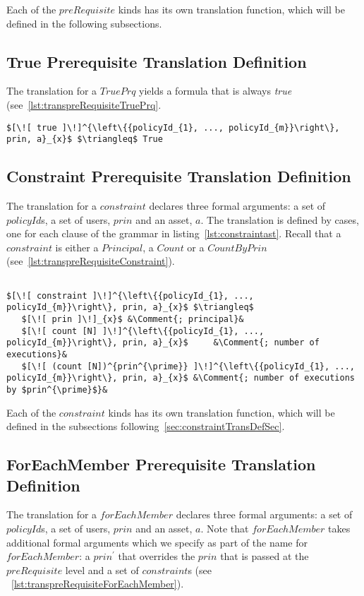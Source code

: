Each of the $preRequisite$ kinds has its own translation function, which will be defined in the following subsections.

\subsection{True Prerequisite Translation Definition}
The translation for a $TruePrq$ yields a formula that is always \emph{true} (see~\ref{lst:transpreRequisiteTruePrq}.

\lstset{mathescape, language=AST}  
\begin{lstlisting}[frame=single, caption={Prerequisite Translation Definition {$\colon$} Always True Prerequisite},label={lst:transpreRequisiteTruePrq}]
	$[\![ true ]\!]^{\left\{{policyId_{1}, ..., policyId_{m}}\right\}, prin, a}_{x}$ $\triangleq$ True
\end{lstlisting}

\subsection{Constraint Prerequisite Translation Definition}
The translation for a $constraint$ declares three formal arguments: a set of $policyId$s, a set of users, $prin$ and an asset, $a$. The translation is defined by cases, one for each clause of the grammar in listing~\ref{lst:constraintast}. Recall that a $constraint$ is either a $Principal$, a $Count$ or a $CountByPrin$ (see~\ref{lst:transpreRequisiteConstraint}).


\lstset{mathescape, language=AST}  
\begin{lstlisting}[frame=single, caption={Prerequisite Translation Definition {$\colon$} Constraint},label={lst:transpreRequisiteConstraint}]

$[\![ constraint ]\!]^{\left\{{policyId_{1}, ..., policyId_{m}}\right\}, prin, a}_{x}$ $\triangleq$ 
   $[\![ prin ]\!]_{x}$ &\Comment{; principal}&
   $[\![ count [N] ]\!]^{\left\{{policyId_{1}, ..., policyId_{m}}\right\}, prin, a}_{x}$	 &\Comment{; number of executions}&
   $[\![ (count [N])^{prin^{\prime}} ]\!]^{\left\{{policyId_{1}, ..., policyId_{m}}\right\}, prin, a}_{x}$ &\Comment{; number of executions by $prin^{\prime}$}&
\end{lstlisting}

Each of the $constraint$ kinds has its own translation function, which will be defined in the subsections following~\ref{sec:constraintTransDefSec}.

\subsection{ForEachMember Prerequisite Translation Definition}
The translation for a $forEachMember$ declares three formal arguments: a set of $policyId$s, a set of users, $prin$ and an asset, $a$. Note that $forEachMember$ takes additional formal arguments which we specify as part of the name for $forEachMember$: a $prin^{\prime}$ that overrides the $prin$ that is passed at the $preRequisite$ level and a set of $constraint$s (see ~\ref{lst:transpreRequisiteForEachMember}).



